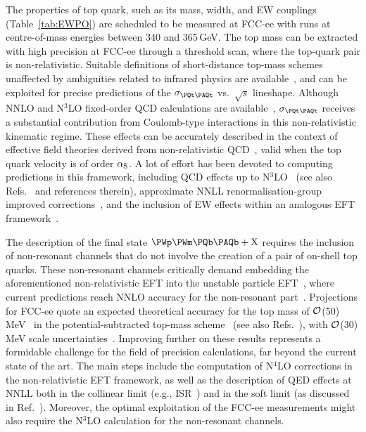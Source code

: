 The properties of top quark, 
such as its mass, width, and EW couplings (Table~\ref{tab:EWPO}) are scheduled to be measured at FCC-ee
with runs at centre-of-mass energies between 340 and 365\,GeV.
The top mass can be extracted with high precision at FCC-ee through a threshold scan, 
where the top-quark pair is non-relativistic.
Suitable definitions of short-distance top-mass schemes unaffected by ambiguities related to infrared physics 
are available~\cite{Bigi:1997fj,Hoang:1998hm,Hoang:1998ng,Beneke:1998rk,Pineda:2001zq},
and can be exploited for precise predictions of the  $\sigma_{\ttbar}$ vs.\ $\sqrt{s}$ lineshape.
Although NNLO and N$^3$LO fixed-order QCD calculations are available~\cite{Chen:2016zbz,Chen:2022vzo}, 
$\sigma_{\ttbar}$ receives a substantial contribution from Coulomb-type interactions in this non-relativistic kinematic regime.
These effects can be accurately described in the context of effective field theories 
derived from non-relativistic QCD~\cite{Thacker:1990bm,Lepage:1992tx,Bodwin:1994jh}, 
valid when the top quark velocity is of order $\alpha_{\rm S}$. 
A lot of effort has been devoted to computing predictions in this framework, 
including QCD effects up to N$^3$LO~\cite{Beneke:2015kwa} 
(see also Refs.~\cite{Hoang:2000yr,Beneke:2013jia} and references therein),
approximate NNLL renormalisation-group improved corrections~\cite{Hoang:2013uda}, 
and the inclusion of EW effects within an analogous EFT framework~\cite{Beneke:2017rdn}.

The description of the final state $\PWp\PWm \PQb\PAQb + \mathrm{X}$
requires the inclusion of non-resonant channels that do not involve the creation of a pair of on-shell top quarks. 
These non-resonant channels critically demand embedding the aforementioned non-relativistic EFT
into the unstable particle EFT~\cite{Beneke:2003xh,Beneke:2004km},
where current predictions reach NNLO accuracy for the non-resonant part~\cite{Beneke:2017rdn}.
Projections for FCC-ee quote an expected theoretical accuracy for the top mass of ${\cal O}$(50)\,MeV~\cite{Beneke:2017rdn} 
in the potential-subtracted top-mass scheme~\cite{Beneke:1998rk} 
(see also Refs.~\cite{Vos:2016til,Abramowicz:2018rjq}), 
with ${\cal O}$(30)\,MeV scale uncertainties~\cite{Beneke:2024sfa,defranchis_2024_cqd16-xhk71}. 
%
Improving further on these results represents a formidable challenge for the field of precision calculations, 
far beyond the current state of the art. 
The main steps include the computation of N$^4$LO corrections in the non-relativistic EFT framework, 
as well as the description of QED effects at NNLL both in the collinear limit 
(e.g., ISR~\cite{Bertone:2019hks,Frixione:2019lga}) and in the soft limit 
(as discussed in Ref.~\cite{BenekeEWPrecisionWshop}).
Moreover, the optimal exploitation of the FCC-ee measurements might also require the N$^3$LO calculation for the non-resonant channels.

